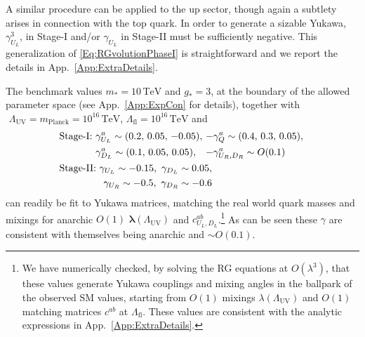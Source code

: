 \documentclass[aps,prl,twocolumn,showpacs,10pt,preprintnumbers,nofootinbib]{revtex4-2}
\newcommand{\TeV}{\,\mathrm{TeV}}
\newcommand{\gst}{g_*}
\newcommand{\mst}{m_*}
\newcommand{\Lfl}{\Lambda_{\text{fl}}}
\begin{document}
{A similar procedure can be applied to the up sector, though again a subtlety arises in connection with the top quark. In order to generate a sizable Yukawa, $\gamma_{U_L}^3$, in Stage-I and/or $\gamma_{U_L}$ in Stage-II must be sufficiently negative. This generalization of \eqref{Eq:RGvolutionPhaseI} is straightforward and we report the details in App.~\ref{App:ExtraDetails}. 

The benchmark values $\mst= 10 \TeV$ and $\gst=3 $, at the boundary of the allowed parameter space (see App.~\ref{App:ExpCon} for details),
together with $\,\,\Lambda_{\text{UV}}= m_{\text{Planck}}=10^{16}\TeV$, $\Lfl= 10^{16}\TeV$ and 
\begin{align}\label{Eq:Benchmark}
\small
&\begin{aligned}
\text{Stage-I: }
&\gamma_{U_L}^a \sim (0.2,\, 0.05,\,-0.05),\, 
-\gamma_Q^a \sim (0.4,\,0.3,\,0.05),\,\\
&\gamma_{D_L}^a \sim (0.1,\, 0.05,\, 0.05),\,
\,\,\,\,-\gamma_{U_R,D_R}^a \sim O(0.1)
\end{aligned}\notag\\
&\begin{aligned}
\text{Stage-II: }
\gamma_{U_L} \sim -0.15,\ 
\gamma_{D_L} \sim 0.05,\\
\gamma_{U_R} \sim -0.5,\ 
\gamma_{D_R} \sim -0.6
\end{aligned}
\end{align}
can readily be fit to Yukawa matrices, matching the real world quark masses and mixings for anarchic $O(1)$ $\boldsymbol{\lambda}(\Lambda_{\text{UV}})$ and $c_{U_L,D_L}^{ab}$.\footnote{We have numerically checked, by solving the RG equations at $O(\lambda^3)$, that these values generate Yukawa couplings and mixing angles in the ballpark of the observed SM values, starting from $O(1)$ mixings $\lambda(\Lambda_{\text{UV}})$ and $O(1)$ matching matrices $c^{ab}$ at $\Lfl$. These values are consistent with the analytic expressions in App.~\ref{App:ExtraDetails}.}
 As can be seen these $\gamma$ are consistent with themselves being anarchic and $\sim O(0.1)$.

}
\end{document}
